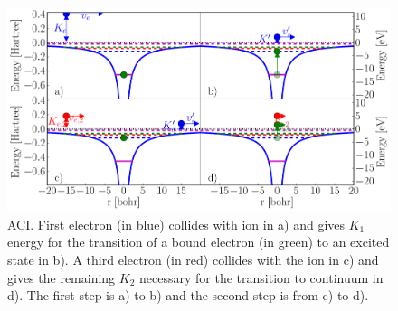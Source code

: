 \begin{figure}
 \centering
 \includegraphics[width=\figurewidth]{figures/ionization_aci}
 \caption{ACI. First electron (in blue) collides with ion in a) and gives
          $K_1$ energy for the transition of a bound electron (in green) to an
          excited state in b).
          A third electron (in red) collides with the ion in c) and
          gives the remaining $K_2$ necessary for the transition to continuum
          in d). The first step is a) to b) and the second step is from c) to d).}
 \label{fig:ionization:aci}
\end{figure}



